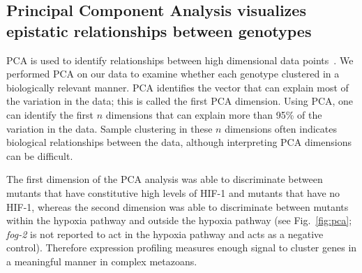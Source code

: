 \documentclass[9pt,twocolumn,twoside,lineno]{pnas-new}
\newcommand{\gene}[1]{\mbox{\emph{#1}}}
\newcommand{\fog}{\gene{fog-2(lf)}}
\newcommand{\egl}{\gene{egl-9}(lf)}
\newcommand{\rhy}{\gene{rhy-1}(lf)}
\newcommand{\vhl}{\gene{vhl-1}(lf)}
\newcommand{\eglvhl}{\gene{egl-9(lf);vhl-1(lf)}}
\newcommand{\eglhif}{\gene{egl-9(lf) hif-1(lf)}}
\newcommand{\hif}{\gene{hif-1(lf)}}
\newcommand{\hifp}{HIF-1}
\begin{document}
\subsection*{Principal Component Analysis visualizes epistatic relationships
             between genotypes}
\label{sub:Clustering}

PCA is used to identify relationships between
high dimensional data points~\cite{Yeung2001}. We performed PCA on our data to
examine whether each genotype clustered in a biologically relevant manner. PCA
identifies the vector that can explain most of the variation in the data; this
is called the first PCA dimension. Using PCA, one can identify the first $n$
dimensions that can explain more than 95\% of the variation in the data. Sample
clustering in these $n$ dimensions often indicates biological relationships
between the data, although interpreting PCA dimensions can be difficult.


The first dimension of the PCA analysis was able to discriminate between mutants
that have constitutive high levels of \hifp{} and mutants that have no \hifp{},
whereas the second dimension was able to discriminate between mutants within the
hypoxia pathway and outside the hypoxia pathway (see Fig.~\ref{fig:pca};
\gene{fog-2} is not reported to act in the hypoxia pathway and acts as a
negative control). Therefore expression profiling measures enough signal to
cluster genes in a meaningful manner in complex metazoans.
\end{document}
